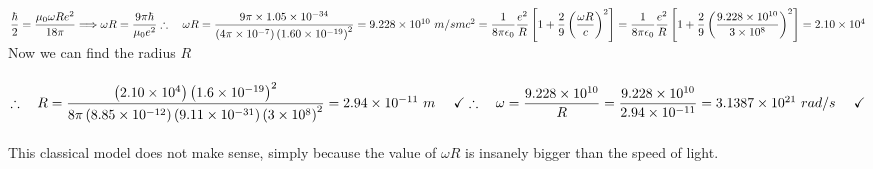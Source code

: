\documentclass[fleqn]{article}
\begin{document}
\begin{enumerate}
\begin{enumerate}
        \textcolor{hwColor}{
          \\
          $
            \dfrac{\hbar}{2}=\dfrac{\mu_0 \omega R e^2}{18 \pi} \Longrightarrow \omega R=\dfrac{9 \pi \hbar}{\mu_0 e^2}
            \\
            \\
            \\
            \therefore ~~~ \omega R=\dfrac{9 \pi \times 1.05 \times 10^{-34}}{\left(4 \pi \times 10^{-7}\right) \left(1.60 \times 10^{-19}\right)^2}
            =9.228 \times 10^{10} ~ m/s
            \\
            \\
            \\
            mc^2=\dfrac{1}{8 \pi \epsilon_0} \dfrac{e^2}{R} \left[1+\dfrac{2}{9}\left(\dfrac{\omega R}{c}\right)^2\right]
            =\dfrac{1}{8 \pi \epsilon_0} \dfrac{e^2}{R} \left[1+\dfrac{2}{9}\left(\dfrac{9.228 \times 10^{10}}{3 \times 10^8}\right)^2\right]
            =2.10 \times 10^4
            \\
            \\
          $
          \\
          Now we can find the radius $R$
          \\
          \\
          $
            \therefore ~~~ R=\dfrac{\left(2.10 \times 10^4\right) \left(1.6 \times 10^{-19}\right)^2}{8 \pi \left(8.85 \times 10^{-12}\right) \left(9.11 \times 10^{-31}\right) \left(3 \times 10^8\right)^2}
            =2.94 \times 10^{-11} ~ m ~~~~ \checkmark
            \\
            \\
            \\
            \therefore ~~~ \omega=\dfrac{9.228 \times 10^{10}}{R}=\dfrac{9.228 \times 10^{10}}{2.94 \times 10^{-11}}=3.1387 \times 10^{21} ~ rad/s ~~~~ \checkmark
          $
          \\
          \\
          This classical model does not make sense, simply because the value of $\omega R$ is insanely bigger than the speed of light.
          \\
        }
      
    \end{enumerate}


  \end{enumerate}
\end{document}
